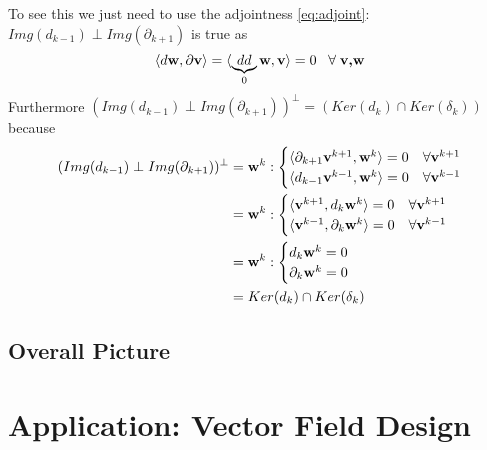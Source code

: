 To see this we just need to use the adjointness \ref{eq:adjoint}: $Img(d_{k-1}) \perp Img (\partial_{k+1})$ is true as
\[\langle d \textbf{w} , \partial \textbf{v}\rangle = \langle \underbrace{dd}_{0} \textbf{w} , \textbf{v} \rangle = 0 \;\;\; \forall\; \textbf{v,w}\]
Furthermore $(Img(d_{k-1}) \perp Img (\partial_{k+1}))^\perp = \left(Ker(d_k) \cap Ker(\delta_k)\right)$ because
\begin{align*}
(Img(d_{k-1}) \perp Img (\partial_{k+1}))^\perp &= \textbf{w}^k: \begin{cases} \langle \partial_{k+1}\textbf{v}^{k+1},\textbf{w}^k \rangle = 0 & \forall \textbf{v}^{k+1}\\
\langle d_{k-1}\textbf{v}^{k-1},\textbf{w}^k \rangle = 0 & \forall \textbf{v}^{k-1}\end{cases} \\
&= \textbf{w}^k: \begin{cases} \langle \textbf{v}^{k+1},d_{k}\textbf{w}^k \rangle = 0 & \forall \textbf{v}^{k+1}\\
\langle \textbf{v}^{k-1},\partial_{k}\textbf{w}^k \rangle = 0 & \forall \textbf{v}^{k-1}\end{cases} \\
&= \textbf{w}^k: \begin{cases} d_{k}\textbf{w}^k = 0 \\
\partial_{k}\textbf{w}^k  = 0 \end{cases}\\
&= Ker(d_k) \cap Ker(\delta_k)
\end{align*}





\subsection{Overall Picture}

\section{Application: Vector Field Design}

